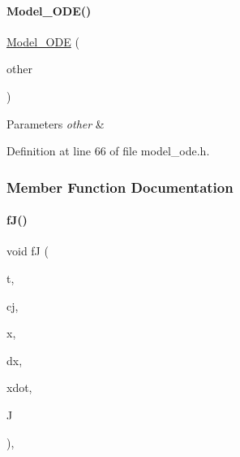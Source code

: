 \paragraph{\texorpdfstring{Model\+\_\+\+O\+D\+E()}{Model\_ODE()}\hspace{0.1cm}{\footnotesize\ttfamily [3/3]}}
{\footnotesize\ttfamily \mbox{\hyperlink{classamici_1_1_model___o_d_e}{Model\+\_\+\+O\+DE}} (\begin{DoxyParamCaption}\item[{\mbox{\hyperlink{classamici_1_1_model___o_d_e}{Model\+\_\+\+O\+DE}} const \&}]{other }\end{DoxyParamCaption})}


\begin{DoxyParams}{Parameters}
{\em other} & \\
\hline
\end{DoxyParams}


Definition at line 66 of file model\+\_\+ode.\+h.



\subsubsection{Member Function Documentation}
\mbox{\label{classamici_1_1_model___o_d_e_a99337eaeac6c70528c3464affe13df2e}} 
\paragraph{\texorpdfstring{f\+J()}{fJ()}\hspace{0.1cm}{\footnotesize\ttfamily [1/3]}}
{\footnotesize\ttfamily void fJ (\begin{DoxyParamCaption}\item[{\mbox{\hyperlink{namespaceamici_a1bdce28051d6a53868f7ccbf5f2c14a3}{realtype}}}]{t,  }\item[{\mbox{\hyperlink{namespaceamici_a1bdce28051d6a53868f7ccbf5f2c14a3}{realtype}}}]{cj,  }\item[{\mbox{\hyperlink{classamici_1_1_ami_vector}{Ami\+Vector}} $\ast$}]{x,  }\item[{\mbox{\hyperlink{classamici_1_1_ami_vector}{Ami\+Vector}} $\ast$}]{dx,  }\item[{\mbox{\hyperlink{classamici_1_1_ami_vector}{Ami\+Vector}} $\ast$}]{xdot,  }\item[{Dls\+Mat}]{J }\end{DoxyParamCaption})\hspace{0.3cm}{\ttfamily [override]}, {\ttfamily [virtual]}}

